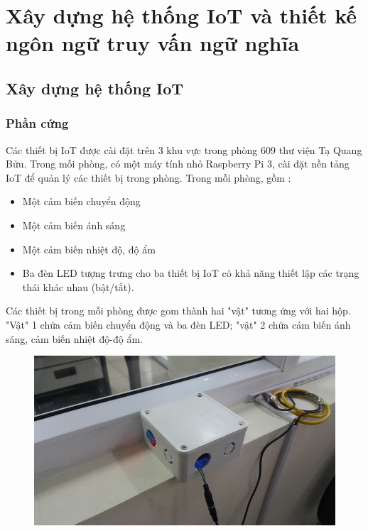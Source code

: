\chapter{Xây dựng hệ thống IoT và thiết kế ngôn ngữ truy vấn ngữ nghĩa}

\section{Xây dựng hệ thống IoT}
\subsection{Phần cứng}

Các thiết bị IoT được cài đặt trên 3 khu vực trong phòng 609 thư viện Tạ Quang Bửu. Trong mỗi phòng, có một máy tính nhỏ Raspberry Pi 3, cài đặt nền tảng IoT để quản lý các thiết bị trong phòng. Trong mỗi phòng, gồm :
\begin{itemize}
	\item Một cảm biến chuyển động
	\item Một cảm biến ánh sáng
	\item Một cảm biến nhiệt độ, độ ẩm
	\item Ba đèn LED tượng trưng cho ba thiết bị IoT có khả năng thiết lập các trạng thái khác nhau (bật/tắt).
\end{itemize}
Các thiết bị trong mỗi phòng được gom thành hai "vật" tương ứng với hai hộp. "Vật" 1 chứa cảm biến chuyển động và ba đèn LED; "vật" 2 chứa cảm biến ánh sáng, cảm biến nhiệt độ-độ ẩm. 
\clearpage

\begin{figure}
	\center
	\includegraphics[scale=1]{image/hop_1}
	\label{fig:2hop}
\end{figure}

